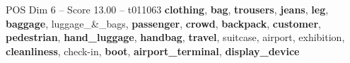 \begin{textsample}{POS Dim 6 – Score 13.00 – t011063}  \label{ex:f6_pos_021}
\textbf{clothing}, \textbf{bag}, \textbf{trousers}, \textbf{jeans}, \textbf{leg}, \textbf{baggage}, luggage\_\&\_bags, \textbf{passenger}, \textbf{crowd}, \textbf{backpack}, \textbf{customer}, \textbf{pedestrian}, \textbf{hand\_luggage}, \textbf{handbag}, \textbf{travel}, suitcase, airport, exhibition, \textbf{cleanliness}, check-in, \textbf{boot}, \textbf{airport\_terminal}, \textbf{display\_device}

\end{textsample}
